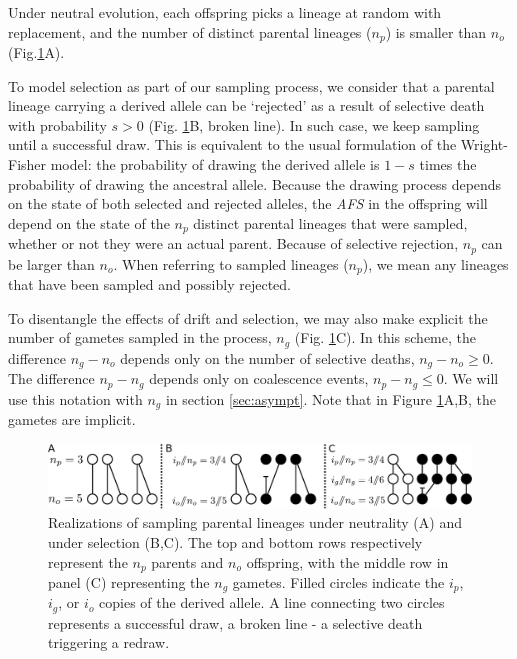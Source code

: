 \documentclass[review]{elsarticle}
\begin{document}
Under neutral evolution, each offspring picks a lineage at random with replacement, and the number
of distinct parental lineages ($n_p$) is smaller than $n_o$ (Fig.\ref{fig:schematic}A).

To model selection as part of our sampling process, we consider that a parental lineage carrying a
derived allele can be `rejected' as a result of selective death with probability $s>0$ (Fig.
\ref{fig:schematic}B, broken line). In such case, we keep sampling until a successful draw. This is
equivalent to the usual formulation of the Wright-Fisher model: the probability of drawing the
derived allele is $1-s$ times the probability of drawing the ancestral allele. Because the drawing
process depends on the state of both selected and rejected alleles, the \textit{AFS} in the
offspring will depend on the state of the $n_p$ distinct parental lineages that were sampled,
whether or not they were an actual parent. Because of selective rejection, $n_p$ can be larger than
$n_o$. When referring to sampled lineages ($n_p$), we mean any lineages that have been sampled and
possibly rejected.

To disentangle the effects of drift and selection, we may also make explicit the number of gametes
sampled in the process, $n_g$ (Fig. \ref{fig:schematic}C). In this scheme, the difference $n_g-n_o$
depends only on the number of selective deaths, $n_g-n_o \ge 0$. The difference $n_p-n_g$ depends
only on coalescence events, $n_p-n_g \le 0$. We will use this notation with $n_g$ in section
\ref{sec:asympt}. Note that in Figure \ref{fig:schematic}A,B, the gametes are implicit.

\begin{figure}[h]
  \centering
  \includegraphics[width=1.0\textwidth]{fig/schematic.pdf}
  \caption{\label{fig:schematic} Realizations of sampling parental lineages under neutrality (A) and
    under selection (B,C). The top and bottom rows respectively represent the $n_p$ parents and
    $n_o$ offspring, with the middle row in panel (C) representing the $n_g$ gametes. Filled circles
    indicate the $i_p$, $i_g$, or $i_o$ copies of the derived allele. A line connecting two circles
    represents a successful draw, a broken line - a selective death triggering a redraw. }
\end{figure}
\end{document}
